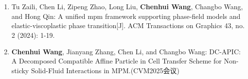 \chapter*{}
\begin{enumerate}
	\renewcommand{\labelenumi}{[\theenumi]}
	\renewcommand\baselinestretch{1}\selectfont   
	\item Tu Zaili, Chen Li, Zipeng Zhao, Long Liu, \textbf{Chenhui Wang}, Changbo Wang, and Hong Qin: A unified mpm framework supporting phase-field models and elastic-viscoplastic phase transition[J]. ACM Transactions on Graphics 43, no. 2 (2024): 1-19.
	\item \textbf{Chenhui Wang}, Jianyang Zhang, Chen Li, and Changbo Wang: DC-APIC: A Decomposed Compatible Affine Particle in Cell Transfer Scheme for Non-sticky Solid-Fluid Interactions in MPM.(CVM2025会议)
\end{enumerate}
